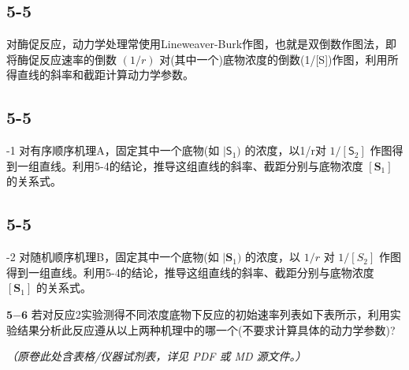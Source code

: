\subsection*{5-5}
对酶促反应，动力学处理常使用Lineweaver-Burk作图，也就是双倒数作图法，即将酶促反应速率的倒数 $( 1 / r )$ 对(其中一个)底物浓度的倒数(1/[S])作图，利用所得直线的斜率和截距计算动力学参数。

\subsection*{5-5}
-1 对有序顺序机理A，固定其中一个底物(如 $| \mathsf { S } _ { 1 } )$ 的浓度，以1/r对 $1 / [ \mathsf { S } _ { 2 } ]$ 作图得到一组直线。利用5-4的结论，推导这组直线的斜率、截距分别与底物浓度 $[ \mathbf { S } _ { 1 } ]$ 的关系式。

\subsection*{5-5}
-2 对随机顺序机理B，固定其中一个底物(如 $| \mathbf { S } _ { 1 } )$ 的浓度，以 $1 / r$ 对 $1 / [ S _ { 2 } ]$ 作图得到一组直线。利用5-4的结论，推导这组直线的斜率、截距分别与底物浓度 $[ \mathbf { S } _ { 1 } ]$ 的关系式。

${ \pmb 5 } { \pmb - } { \pmb 6 }$ 若对反应2实验测得不同浓度底物下反应的初始速率列表如下表所示，利用实验结果分析此反应遵从以上两种机理中的哪一个(不要求计算具体的动力学参数)?

\textit{（原卷此处含表格/仪器试剂表，详见 PDF 或 MD 源文件。）}
